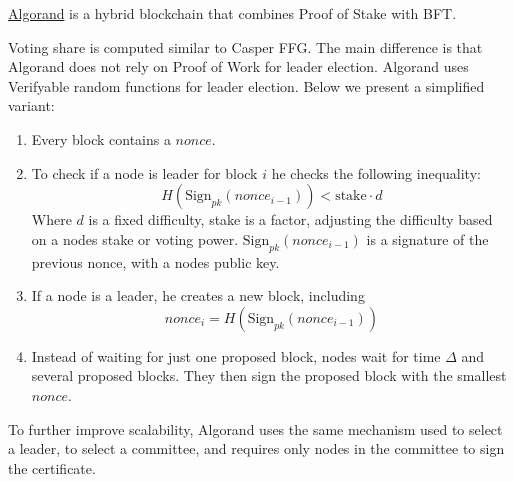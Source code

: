 \href{https://dl.acm.org/doi/10.1145/3132747.3132757}{Algorand} is a hybrid blockchain that combines Proof of Stake with BFT.

Voting share is computed similar to Casper FFG.
The main difference is that Algorand does not rely on Proof of Work for leader election. Algorand uses Verifyable random functions for leader election. 
Below we present a simplified variant:

\begin{enumerate}
	\item Every block contains a $nonce$.
	\item To check if a node is leader for block $i$ he checks the following inequality:
	\[
		H(\text{Sign}_{pk}(nonce_{i-1}))< \text{stake}\cdot d
	\]
	Where $d$ is a fixed difficulty, stake is a factor, adjusting the difficulty based on a nodes stake or voting power. $\text{Sign}_{pk}(nonce_{i-1})$ is a signature of the previous nonce, with a nodes public key.
	\item If a node is a leader, he creates a new block, including 
	\[
		nonce_i = H(\text{Sign}_{pk}(nonce_{i-1}))
	\]
	\item Instead of waiting for just one proposed block, nodes wait for time $\Delta$ and several proposed blocks. They then sign the proposed block with the smallest $nonce$.
\end{enumerate}

To further improve scalability, Algorand uses the same mechanism used to select a leader, to select a committee, and requires only nodes in the committee to sign the certificate. 